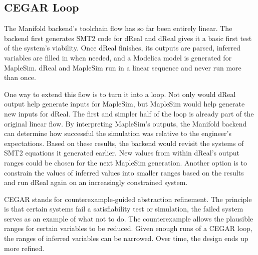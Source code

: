 \subsection{CEGAR Loop}

The Manifold backend's toolchain flow has so far been entirely linear.
The backend first generates SMT2 code for dReal and dReal gives it a basic first test of the system's viability.
Once dReal finishes, its outputs are parsed, inferred variables are filled in when needed, and a Modelica model is generated for MapleSim.
dReal and MapleSim run in a linear sequence and never run more than once.

One way to extend this flow is to turn it into a loop.
Not only would dReal output help generate inputs for MapleSim, but MapleSim would help generate new inputs for dReal.
The first and simpler half of the loop is already part of the original linear flow.
By interpreting MapleSim's outputs, the Manifold backend can determine how successful the simulation was relative to the engineer's expectations.
Based on these results, the backend would revisit the systems of SMT2 equations it generated earlier.
New values from within dReal's output ranges could be chosen for the next MapleSim generation.
Another option is to constrain the values of inferred values into smaller ranges based on the results and run dReal again on an increasingly constrained system.

CEGAR stands for counterexample-guided abstraction refinement.
The principle is that certain systems fail a satisfiability test or simulation, the failed system serves as an example of what not to do.
The counterexample allows the plausible ranges for certain variables to be reduced.
Given enough runs of a CEGAR loop, the ranges of inferred variables can be narrowed.
Over time, the design ends up more refined.

